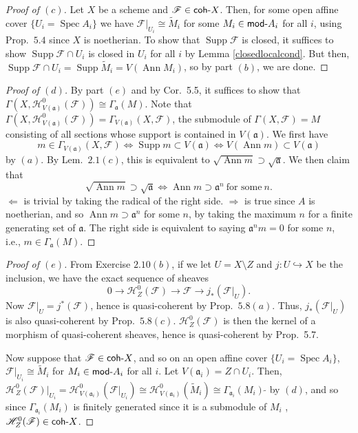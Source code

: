 \documentclass[10pt]{article}
\theoremstyle{definition}
\theoremstyle{remark}
\numberwithin{equation}{section}
\numberwithin{figure}{subsubsection}
\DeclareMathOperator{\Ann}{Ann}
\DeclareMathOperator{\Supp}{Supp}
\DeclareMathOperator{\Spec}{Spec}
\newcommand{\FF}{\mathscr{F}}
\newcommand{\HH}{\mathscr{H}}
\newcommand{\Mod}{\mathsf{mod}\mathchar`-}
\newcommand{\coh}{\mathsf{coh}\mathchar`-}
\begin{document}
\begin{proof}[Proof of $(c)$]
  Let $X$ be a scheme and $\FF \in \coh X$. Then, for some open affine cover $\{U_i = \Spec A_i\}$ we have $\FF\vert_{U_i} \cong \tilde{M}_i$ for some $M_i \in \Mod A_i$ for all $i$, using Prop.~$5.4$ since $X$ is noetherian. To show that $\Supp \FF$ is closed, it suffices to show $\Supp \FF \cap U_i$ is closed in $U_i$ for all $i$ by Lemma \ref{closedlocalcond}. But then, $\Supp \FF \cap U_i = \Supp \tilde{M}_i = V(\Ann M_i)$, so by part $(b)$, we are done.
\end{proof}
\begin{proof}[Proof of $(d)$]
  By part $(e)$ and by Cor.~5.5, it suffices to show that $\Gamma(X,\HH_{V(\mathfrak{a})}^0(\FF)) \cong \Gamma_\mathfrak{a}(M)$. Note that $\Gamma(X,\HH_{V(\mathfrak{a})}^0(\FF)) = \Gamma_{V(\mathfrak{a})}(X,\FF)$, the submodule of $\Gamma(X,\FF) = M$ consisting of all sections whose support is contained in $V(\mathfrak{a})$. We first have
  \begin{equation*}
    m \in \Gamma_{V(\mathfrak{a})}(X,\FF) \iff \Supp m \subset V(\mathfrak{a}) \iff V(\Ann m) \subset V(\mathfrak{a})
  \end{equation*}
  by $(a)$. By Lem.~$2.1(c)$, this is equivalent to $\sqrt{\Ann m} \supset \sqrt{\mathfrak{a}}$. We then claim that
  \begin{equation*}
    \sqrt{\Ann m} \supset \sqrt{\mathfrak{a}} \iff \Ann m \supset \mathfrak{a}^n~\text{for some}~n.
  \end{equation*}
  $\Leftarrow$ is trivial by taking the radical of the right side. $\Rightarrow$ is true since $A$ is noetherian, and so $\Ann m \supset \mathfrak{a}^n$ for some $n$, by taking the maximum $n$ for a finite generating set of $\mathfrak{a}$. The right side is equivalent to saying $\mathfrak{a}^nm = 0$ for some $n$, i.e., $m \in \Gamma_\mathfrak{a}(M)$.
\end{proof}
\begin{proof}[Proof of $(e)$]
  From Exercise $2.10(b)$, if we let $U = X \setminus Z$ and $j\colon U \hookrightarrow X$ be the inclusion, we have the exact sequence of sheaves
  \begin{equation*}
    0 \longrightarrow \HH_{Z}^0(\FF) \longrightarrow \FF \longrightarrow j_*(\FF\vert_U).
  \end{equation*}
  Now $\FF\vert_U = j^*(\FF)$, hence is quasi-coherent by Prop.~$5.8(a)$. Thus, $j_*(\FF\vert_U)$ is also quasi-coherent by Prop.~$5.8(c)$. $\HH_{Z}^0(\FF)$ is then the kernel of a morphism of quasi-coherent sheaves, hence is quasi-coherent by Prop.~5.7. 
  \par Now suppose that $\FF \in \coh X$, and so on an open affine cover $\{U_i = \Spec A_i\}$, $\FF\vert_{U_i} \cong \tilde{M}_i$ for $M_i \in \Mod A_i$ for all $i$. Let $V(\mathfrak{a}_i) = Z \cap U_i$. Then, $\HH_{Z}^0(\FF)\vert_{U_i} = \HH_{V(\mathfrak{a}_i)}^0(\FF\vert_{U_i}) \cong \HH_{V(\mathfrak{a}_i)}^0(\tilde{M}_i) \cong \Gamma_{\mathfrak{a}_i}(M_i)\:\tilde{}$ by $(d)$, and so since $\Gamma_{\mathfrak{a}_i}(M_i)$ is finitely generated since it is a submodule of $M_i$ \cite[Prop.~6.2]{AM69}, $\HH_{Z}^0(\FF) \in \coh X$.
\end{proof}
\end{document}
